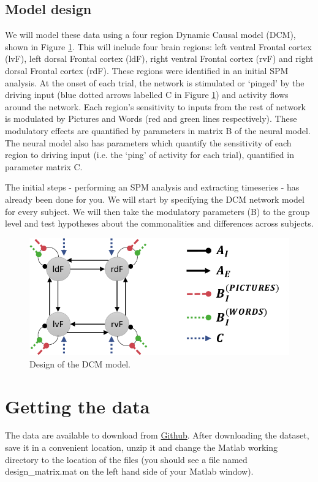 \documentclass{article}
\begin{document}
\subsection{Model design}
We will model these data using a four region Dynamic Causal model (DCM), shown in Figure \ref{Fig_intro_network}. This will include four brain regions: left ventral Frontal cortex (lvF), left dorsal Frontal cortex (ldF), right ventral Frontal cortex (rvF) and right dorsal Frontal cortex (rdF). These regions were identified in an initial SPM analysis. At the onset of each trial, the network is stimulated or `pinged' by the driving input (blue dotted arrows labelled C in Figure  \ref{Fig_intro_network}) and activity flows around the network. Each region's sensitivity to inputs from the rest of network is modulated by Pictures and Words (red and green lines respectively). These modulatory effects are quantified by parameters in matrix B of the neural model. The neural model also has parameters which quantify the sensitivity of each region to driving input (i.e. the `ping' of activity for each trial), quantified in parameter matrix C. 

The initial steps - performing an SPM analysis and extracting timeseries - has already been done for you. We will start by specifying the DCM network model for every subject. We will then take the modulatory parameters (B) to the group level and test hypotheses about the commonalities and differences across subjects.

\begin{figure}[ht]
\begin{center}
\includegraphics{"Fig_intro_network"}
\caption{Design of the DCM model.\label{Fig_intro_network}}
\end{center}
\end{figure}

\section{Getting the data}
The data are available to download from \href{https://github.com/pzeidman/dcm-peb-example/archive/master.zip}{Github}. After downloading the dataset, save it in a convenient location, unzip it and change the Matlab working directory to the location of the files (you should see a file named design\_matrix.mat on the left hand side of your Matlab window).
\end{document}
